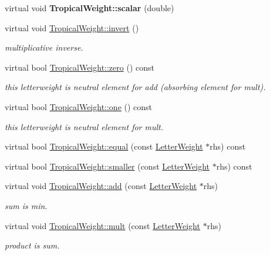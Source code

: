 \begin{DoxyCompactItemize}
virtual void {\bfseries Tropical\+Weight\+::scalar} (double)
\item 
virtual void \mbox{\hyperlink{group__weight_ga2bad107be8a2e71fc12b75196adde070}{Tropical\+Weight\+::invert}} ()
\begin{DoxyCompactList}\small\item\em multiplicative inverse. \end{DoxyCompactList}\item 
\mbox{\label{group__weight_ga55f1e2bcb9e1e3fd521d652a5aebfc36}} 
virtual bool \mbox{\hyperlink{group__weight_ga55f1e2bcb9e1e3fd521d652a5aebfc36}{Tropical\+Weight\+::zero}} () const
\begin{DoxyCompactList}\small\item\em this letterweight is neutral element for add (absorbing element for mult). \end{DoxyCompactList}\item 
\mbox{\label{group__weight_gae362229d75df663272f4d52c15a04315}} 
virtual bool \mbox{\hyperlink{group__weight_gae362229d75df663272f4d52c15a04315}{Tropical\+Weight\+::one}} () const
\begin{DoxyCompactList}\small\item\em this letterweight is neutral element for mult. \end{DoxyCompactList}\item 
virtual bool \mbox{\hyperlink{group__weight_ga7203d6028f02a2791bdeede99ef59b97}{Tropical\+Weight\+::equal}} (const \mbox{\hyperlink{classLetterWeight}{Letter\+Weight}} $\ast$rhs) const
\item 
virtual bool \mbox{\hyperlink{group__weight_ga4237553cf4beafd5a96bd0ac7da7ac11}{Tropical\+Weight\+::smaller}} (const \mbox{\hyperlink{classLetterWeight}{Letter\+Weight}} $\ast$rhs) const
\item 
virtual void \mbox{\hyperlink{group__weight_ga41791f144fea9717092970563337d040}{Tropical\+Weight\+::add}} (const \mbox{\hyperlink{classLetterWeight}{Letter\+Weight}} $\ast$rhs)
\begin{DoxyCompactList}\small\item\em sum is min. \end{DoxyCompactList}\item 
virtual void \mbox{\hyperlink{group__weight_ga6bf7a669a9798ebbd6b4138cce2bade6}{Tropical\+Weight\+::mult}} (const \mbox{\hyperlink{classLetterWeight}{Letter\+Weight}} $\ast$rhs)
\begin{DoxyCompactList}\small\item\em product is sum. \end{DoxyCompactList}\item 

\end{DoxyCompactItemize}
